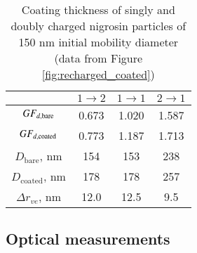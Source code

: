 \begin{table}[htp]
    \centering
    \caption{Coating thickness of singly and doubly charged nigrosin particles of 150 nm initial mobility diameter (data from Figure \ref{fig:recharged_coated})}
    \begin{tabular}{c c c c}
        \hline
        & $1\rightarrow 2$ & $1\rightarrow 1$ & $2\rightarrow 1$ \\
        \hline
        $GF_{d,\rm bare}$ & 0.673 & 1.020 & 1.587\\
        $GF_{d,\rm coated}$ & 0.773 & 1.187 & 1.713\\
        $D_{\mathrm{bare}}$, nm & 154 & 153 & 238 \\
        $D_{\mathrm{coated}}$, nm & 178 & 178 & 257 \\
        $\Delta r_{ve}$, nm & 12.0 & 12.5 & 9.5 \\
        \hline
    \end{tabular}
    \label{tab:recharged_coated}
\end{table}

\subsection{Optical measurements}


